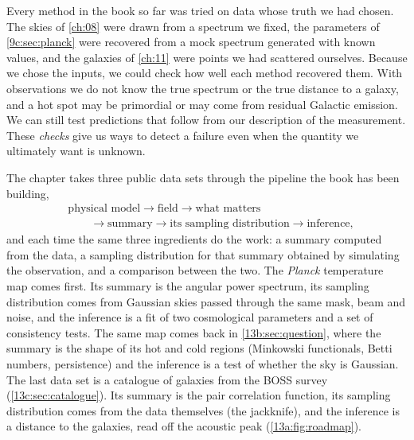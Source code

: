 Every method in the book so far was tried on data whose truth we had chosen. The skies of
\cref{ch:08} were drawn from a spectrum we fixed, the parameters of \cref{9c:sec:planck} were recovered from a
mock spectrum generated with known values, and the galaxies of \cref{ch:11} were points we had scattered
ourselves. Because we chose the inputs, we could check how well each method recovered
them. With observations we do not know the true spectrum or the true distance
to a galaxy, and a hot spot may be primordial or may come from residual
Galactic emission. We can still test predictions that follow from our
description of the measurement. These \emph{checks} give us ways to detect a
failure even when the quantity we ultimately want is unknown.

The chapter takes three public data sets through the pipeline the book has been building,
\begin{align*}
  &\text{physical model}\to\text{field}\to\text{what matters}\\
  &\qquad\to\text{summary}\to\text{its sampling distribution}\to\text{inference},
\end{align*}
and each time the same three ingredients do the work: a summary computed from the data, a sampling
distribution for that summary obtained by simulating the observation, and a comparison between the two.
The \textit{Planck} temperature map comes first. Its summary is the angular power spectrum, its sampling
distribution comes from Gaussian skies passed through the same mask, beam and noise, and the inference is
a fit of two cosmological parameters and a set of consistency tests. The same map comes back in
\cref{13b:sec:question}, where the summary is the shape of its hot and cold regions (Minkowski functionals,
Betti numbers, persistence) and the inference is a test of whether the sky is Gaussian. The last data set
is a catalogue of galaxies from the BOSS survey (\cref{13c:sec:catalogue}). Its summary is the pair
correlation function, its sampling distribution comes from the data themselves (the jackknife), and the
inference is a distance to the galaxies, read off the acoustic peak (\cref{13a:fig:roadmap}).

